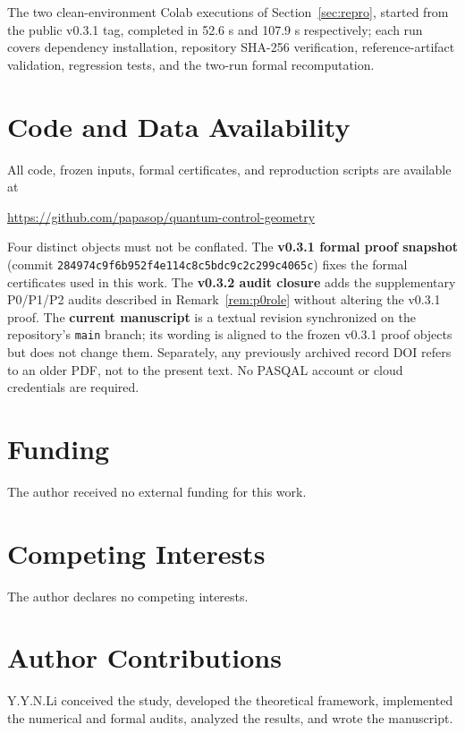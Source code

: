 The two clean-environment Colab executions of Section~\ref{sec:repro}, started from the
public v0.3.1 tag, completed in 52.6 s and 107.9 s respectively; each run covers dependency
installation, repository SHA-256 verification, reference-artifact validation, regression
tests, and the two-run formal recomputation.

\section*{Code and Data Availability}
All code, frozen inputs, formal certificates, and reproduction scripts are available at
\begin{center}
\url{https://github.com/papasop/quantum-control-geometry}
\end{center}
Four distinct objects must not be conflated. The \textbf{v0.3.1 formal proof snapshot}
(commit \texttt{284974c9f6b952f4e114c8c5bdc9c2c299c4065c}) fixes the formal certificates
used in this work. The \textbf{v0.3.2 audit closure} adds the supplementary P0/P1/P2
audits described in Remark~\ref{rem:p0role} without altering the v0.3.1 proof. The
\textbf{current manuscript} is a textual revision synchronized on the repository's
\texttt{main} branch; its wording is aligned to the frozen v0.3.1 proof objects but does
not change them. Separately, any previously archived record DOI refers to an older PDF,
not to the present text. No PASQAL account or cloud credentials are required.

\section*{Funding}
The author received no external funding for this work.

\section*{Competing Interests}
The author declares no competing interests.

\section*{Author Contributions}
Y.Y.N.Li conceived the study, developed the theoretical framework, implemented the
numerical and formal audits, analyzed the results, and wrote the manuscript.

